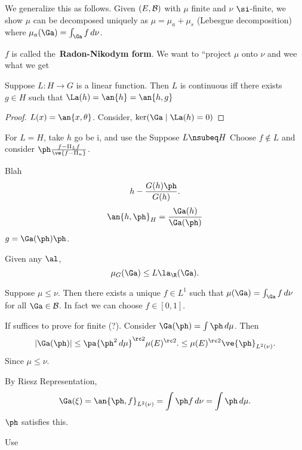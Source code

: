 We generalize this as follows. Given $(E,\cal B)$ with $\mu$ finite and $\nu$ $\si$-finite, we show $\mu$ can be decomposed uniquely as $\mu=\mu_a+\mu_s$ (Lebesgue decomposition) where $\mu_{a}(\Ga)=\int_{\Ga} f\,d\nu$.
 
$f$ is called the~\textbf{Radon-Nikodym form}.
We want to ``project $\mu$ onto $\nu$ and wee what we get

\begin{thm}
Suppose $L:H\to G$ is a linear function. Then $L$ is continuous iff there exists $g\in H$ such that $\La(h)=\an{h}=\an{h,g}$%
\end{thm}
\begin{proof}
$L(x)=\an{x,\theta}$. 
Consider, $\ker(\Ga\mid \La(h)=0)$%
\end{proof}

For $L=H$,  take $h$ go be i, and use the Suppose $L\nsubeq  H$%
Choose $f\nin L$ and consider $\ph\frac{f-\Pi_L f}{\ve{f-\Pi_n}}$.

Blah %
\[
h-\frac{G(h)\ph}{G(h)}.
\]
\[
\an{h,\ph}_H =\frac{\Ga(h)}{\Ga(\ph)}
\]
$g=\Ga(\ph)\ph$.%

Given any $\al$, 
\[\mu_G(\Ga)\le L \la_{\R}(\Ga).\]

\begin{lem}
Suppose $\mu\le \nu$. Then there exists a unique $f\in L^1$ such that $\mu(\Ga)=\int_{\Ga} f\,d\nu$ for all $\Ga\in \cal B$. In fact we can choose $f\in[0,1]$. 

If suffices to prove for finite (?). Consider $\Ga(\ph)=\int \ph \,d\mu$. Then
\[
|\Ga(\ph)|\le\pa{
\ph^2\,d\mu
}^{\rc 2}\mu(E)^{\rc 2}.
\le \mu(E)^{\rc 2} \ve{\ph}_{L^2(\nu)}.
\] Since $\mu\le \nu$.

By Riesz Representation,
\[
\Ga(\xi)=\an{\ph, f}_{L^2(\nu)}=\int \ph f\,d\nu=\int \ph \,d\mu.
\]
$\ph$ satisfies this.

Use 
\end{lem}